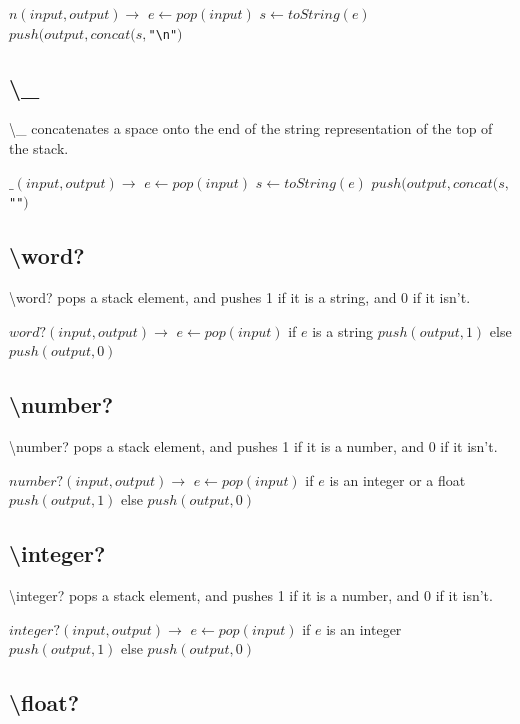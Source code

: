 \documentclass{article}
\let\bs\textbackslash
\def\pc{\bigskip\obeylines\parindent=0pt}
\begin{document}
{{{{{{\pc
$n(input,output)\rightarrow$
\quad $e \leftarrow pop(input)$
\quad $s \leftarrow toString(e)$
\quad $push(output, concat(s,$\texttt{"\bs n"}$)$
}

\subsection{\bs \_}

\bs \_ concatenates a space onto the end of the string representation of the top of the stack.

{\pc
$\_(input,output)\rightarrow$
\quad $e \leftarrow pop(input)$
\quad $s \leftarrow toString(e)$
\quad $push(output, concat(s,$\texttt{"\textvisiblespace "}$)$
}

\subsection{\bs word?}

\bs word? pops a stack element, and pushes 1 if it is a string, and 0 if it isn't.

{\pc
$word?(input, output) \rightarrow$
\quad $e \leftarrow pop(input)$
\quad if $e$ is a string
\quad \quad $push(output, 1)$
\quad else
\quad \quad $push(output, 0)$
}

\subsection{\bs number?}

\bs number? pops a stack element, and pushes 1 if it is a number, and 0 if it isn't.

{\pc
$number?(input, output) \rightarrow$
\quad $e \leftarrow pop(input)$
\quad if $e$ is an integer or a float
\quad \quad $push(output, 1)$
\quad else
\quad \quad $push(output, 0)$
}

\subsection{\bs integer?}

\bs integer? pops a stack element, and pushes 1 if it is a number, and 0 if it isn't.

{\pc
$integer?(input, output) \rightarrow$
\quad $e \leftarrow pop(input)$
\quad if $e$ is an integer
\quad \quad $push(output, 1)$
\quad else
\quad \quad $push(output, 0)$
}

\subsection{\bs float?}

}}}}}
\end{document}
